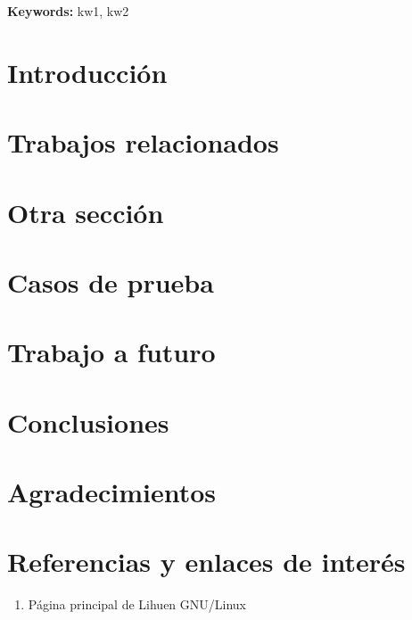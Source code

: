 \documentclass[final,narroweqnarray,inline,twoside]{ieee}
\author{
\\LINTI. Facultad de Informática, Universidad Nacional de La Plata.
\\La Plata, B1900ASD, ARGENTINA
}
\title{}
\begin{document}
\maketitle
\sloppy

\begin{abstract}
\end{abstract}

\noindent \textbf{Keywords: } kw1, kw2

\section{Introducción}

\section{Trabajos relacionados}

\section{Otra sección}

\section{Casos de prueba}

\section{Trabajo a futuro}

\section{Conclusiones}

\section{Agradecimientos}

\section{Referencias y enlaces de interés}

\begin{enumerate}
\item Página principal de Lihuen GNU/Linux\\
\end{enumerate}
\end{document}
